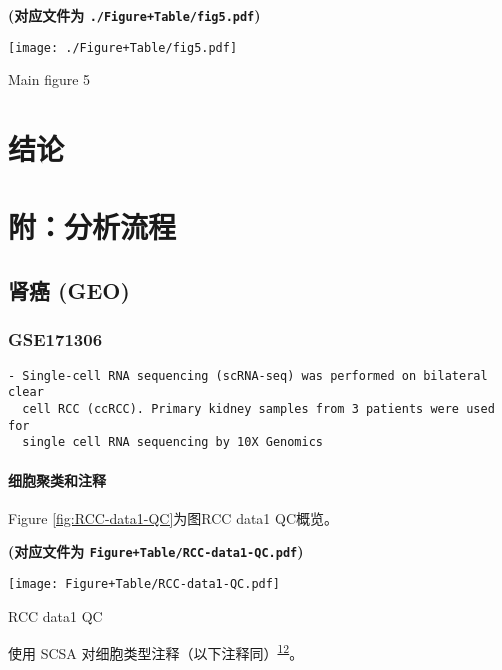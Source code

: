 \documentclass[
]{article}
\begin{document}
\textbf{(对应文件为 \texttt{./Figure+Table/fig5.pdf})}

\def\@captype{figure}
\begin{center}
\texttt{[image: ./Figure+Table/fig5.pdf]}
\caption{Main figure 5}\label{fig:Main-figure-5}
\end{center}

\hypertarget{dis}{%
\section{结论}\label{dis}}

\hypertarget{flow}{%
\section{附：分析流程}\label{flow}}

\hypertarget{rcc1}{%
\subsection{肾癌 (GEO)}\label{rcc1}}

\hypertarget{gse171306}{%
\subsubsection{GSE171306}\label{gse171306}}

\begin{verbatim}
- Single-cell RNA sequencing (scRNA-seq) was performed on bilateral clear
  cell RCC (ccRCC). Primary kidney samples from 3 patients were used for
  single cell RNA sequencing by 10X Genomics
\end{verbatim}

\hypertarget{ux7ec6ux80deux805aux7c7bux548cux6ce8ux91ca}{%
\paragraph{细胞聚类和注释}\label{ux7ec6ux80deux805aux7c7bux548cux6ce8ux91ca}}

Figure \ref{fig:RCC-data1-QC}为图RCC data1 QC概览。

\textbf{(对应文件为 \texttt{Figure+Table/RCC-data1-QC.pdf})}

\def\@captype{figure}
\begin{center}
\texttt{[image: Figure+Table/RCC-data1-QC.pdf]}
\caption{RCC data1 QC}\label{fig:RCC-data1-QC}
\end{center}

使用 SCSA 对细胞类型注释（以下注释同）\textsuperscript{\protect\hyperlink{ref-ScsaACellTyCaoY2020}{12}}。
\end{document}
